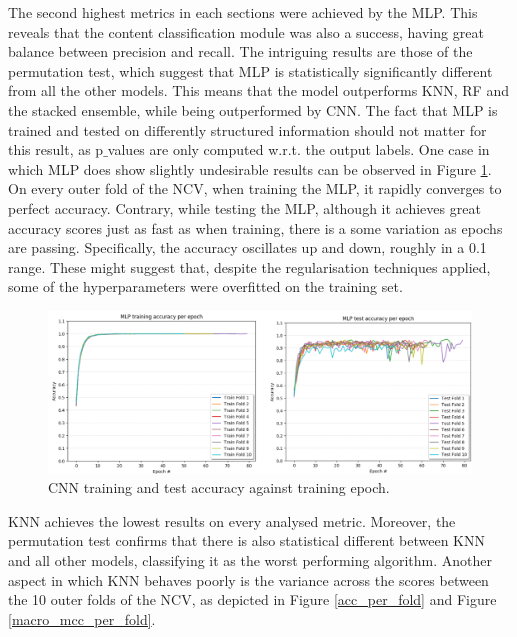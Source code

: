 The second highest metrics in each sections were achieved by the MLP. This reveals that the content classification module was also a success, having great balance between precision and recall. The intriguing results are those of the permutation test, which suggest that MLP is statistically significantly different from all the other models. This means that the model outperforms KNN, RF and the stacked ensemble, while being outperformed by CNN. The fact that MLP is trained and tested on differently structured information should not matter for this result, as p$\_$values are only computed w.r.t. the output labels. One case in which MLP does show slightly undesirable results can be observed in Figure \ref{mlp_train_test}. On every outer fold of the NCV, when training the MLP, it rapidly converges to perfect accuracy. Contrary, while testing the MLP, although it achieves great accuracy scores just as fast as when training, there is a some variation as epochs are passing. Specifically, the accuracy oscillates up and down, roughly in a 0.1 range. These might suggest that, despite the regularisation techniques applied, some of the hyperparameters were overfitted on the training set.\\

\begin{figure}[H]
  \centering
  \centerline{\includegraphics[scale=0.5]{Images/mlp_train_test.png}}
  \caption{CNN training and test accuracy against training epoch.}
  \label{mlp_train_test}
\end{figure}

KNN achieves the lowest results on every analysed metric. Moreover, the permutation test confirms that there is also statistical different between KNN and all other models, classifying it as the worst performing algorithm. Another aspect in which KNN behaves poorly is the variance across the scores between the 10 outer folds of the NCV, as depicted in Figure \ref{acc_per_fold} and Figure \ref{macro_mcc_per_fold}. \\

